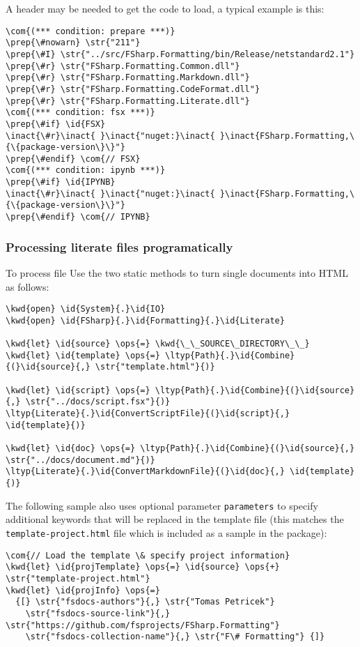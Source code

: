 \documentclass{article}
\newcommand{\id}[1]{\textcolor{black}{#1}}
\newcommand{\com}[1]{\textcolor{officegreen}{#1}}
\newcommand{\inact}[1]{\textcolor{gray}{#1}}
\newcommand{\kwd}[1]{\textcolor{navy}{#1}}
\newcommand{\ops}[1]{\textcolor{purple}{#1}}
\newcommand{\prep}[1]{\textcolor{purple}{#1}}
\newcommand{\str}[1]{\textcolor{olive}{#1}}
\begin{document}
A header may be needed to get the code to load, a typical example is this:
\begin{Verbatim}[commandchars=\\\{\}]
\com{(*** condition: prepare ***)}
\prep{\#nowarn} \str{"211"}
\prep{\#I} \str{"../src/FSharp.Formatting/bin/Release/netstandard2.1"}
\prep{\#r} \str{"FSharp.Formatting.Common.dll"}
\prep{\#r} \str{"FSharp.Formatting.Markdown.dll"}
\prep{\#r} \str{"FSharp.Formatting.CodeFormat.dll"}
\prep{\#r} \str{"FSharp.Formatting.Literate.dll"}
\com{(*** condition: fsx ***)}
\prep{\#if} \id{FSX}
\inact{\#r}\inact{ }\inact{"nuget:}\inact{ }\inact{FSharp.Formatting,\{\{package-version\}\}"}
\prep{\#endif} \com{// FSX}
\com{(*** condition: ipynb ***)}
\prep{\#if} \id{IPYNB}
\inact{\#r}\inact{ }\inact{"nuget:}\inact{ }\inact{FSharp.Formatting,\{\{package-version\}\}"}
\prep{\#endif} \com{// IPYNB}

\end{Verbatim}

\subsubsection*{Processing literate files programatically}



To process file Use the two static methods to turn single documents into HTML
as follows:
\begin{Verbatim}[commandchars=\\\{\}]
\kwd{open} \id{System}{.}\id{IO}
\kwd{open} \id{FSharp}{.}\id{Formatting}{.}\id{Literate}

\kwd{let} \id{source} \ops{=} \kwd{\_\_SOURCE\_DIRECTORY\_\_}
\kwd{let} \id{template} \ops{=} \ltyp{Path}{.}\id{Combine}{(}\id{source}{,} \str{"template.html"}{)}

\kwd{let} \id{script} \ops{=} \ltyp{Path}{.}\id{Combine}{(}\id{source}{,} \str{"../docs/script.fsx"}{)}
\ltyp{Literate}{.}\id{ConvertScriptFile}{(}\id{script}{,} \id{template}{)}

\kwd{let} \id{doc} \ops{=} \ltyp{Path}{.}\id{Combine}{(}\id{source}{,} \str{"../docs/document.md"}{)}
\ltyp{Literate}{.}\id{ConvertMarkdownFile}{(}\id{doc}{,} \id{template}{)}
\end{Verbatim}



The following sample also uses optional parameter \texttt{parameters} to specify additional
keywords that will be replaced in the template file (this matches the \texttt{template-project.html}
file which is included as a sample in the package):
\begin{Verbatim}[commandchars=\\\{\}]
\com{// Load the template \& specify project information}
\kwd{let} \id{projTemplate} \ops{=} \id{source} \ops{+} \str{"template-project.html"}
\kwd{let} \id{projInfo} \ops{=}
  {[} \str{"fsdocs-authors"}{,} \str{"Tomas Petricek"}
    \str{"fsdocs-source-link"}{,} \str{"https://github.com/fsprojects/FSharp.Formatting"}
    \str{"fsdocs-collection-name"}{,} \str{"F\# Formatting"} {]}
\end{Verbatim}
\end{document}
